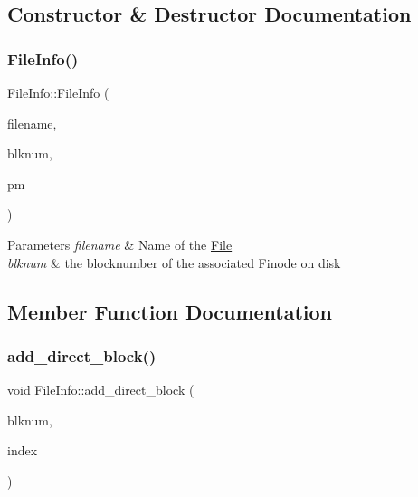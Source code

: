 \subsection{Constructor \& Destructor Documentation}
\mbox{\label{classFileInfo_a3586bb4f50c4a0f63ff4ea0a1e56ce9c}} 
\subsubsection{\texorpdfstring{File\+Info()}{FileInfo()}}
{\footnotesize\ttfamily File\+Info\+::\+File\+Info (\begin{DoxyParamCaption}\item[{string}]{filename,  }\item[{Blk\+Num\+Type}]{blknum,  }\item[{\mbox{\hyperlink{classPartitionManager}{Partition\+Manager}} $\ast$}]{pm }\end{DoxyParamCaption})}


\begin{DoxyParams}{Parameters}
{\em filename} & Name of the \mbox{\hyperlink{classFile}{File}} \\
\hline
{\em blknum} & the blocknumber of the associated Finode on disk \\
\hline
\end{DoxyParams}


\subsection{Member Function Documentation}
\mbox{\label{classFileInfo_a1537d2ac2b5c170d144911c8337c81bc}} 
\subsubsection{\texorpdfstring{add\+\_\+direct\+\_\+block()}{add\_direct\_block()}}
{\footnotesize\ttfamily void File\+Info\+::add\+\_\+direct\+\_\+block (\begin{DoxyParamCaption}\item[{Blk\+Num\+Type}]{blknum,  }\item[{int}]{index }\end{DoxyParamCaption})}

